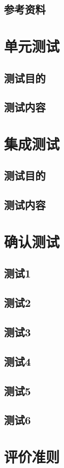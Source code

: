 \documentclass[
    report,     %
    oneside,    %
    UTF8,       %
    zihao=-4    %
]{config} %
\begin{document}
\subsection{参考资料}
\section{单元测试}
\subsection{测试目的}
\subsection{测试内容}
\section{集成测试}
\subsection{测试目的}
\subsection{测试内容}
\section{确认测试}
\subsection{测试1}
\subsection{测试2}
\subsection{测试3}
\subsection{测试4}
\subsection{测试5}
\subsection{测试6}

\section{评价准则}
\end{document}

